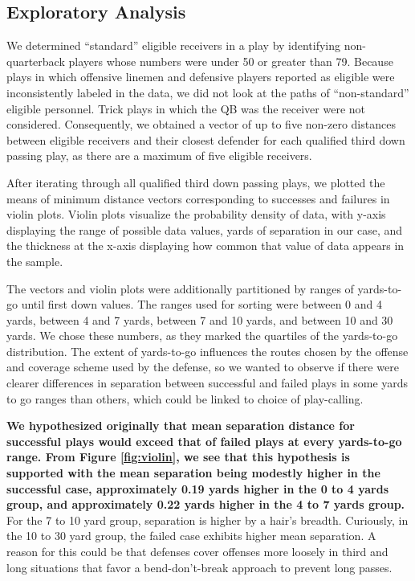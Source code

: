 \documentclass[12pt,letterpaper]{article}
\begin{document}
\newpage
\subsection*{Exploratory Analysis}
 
We determined ``standard'' eligible receivers in a play by identifying non-quarterback players whose numbers were under 50 or greater than 79. Because plays in which offensive linemen and defensive players reported as eligible were inconsistently labeled in the data, we did not look at the paths of ``non-standard'' eligible personnel. Trick plays in which the QB was the receiver were not considered. Consequently, we obtained a vector of up to five non-zero distances between eligible receivers and their closest defender for each qualified third down passing play, as there are a maximum of five eligible receivers. 

After iterating through all qualified third down passing plays, we plotted the means of minimum distance vectors corresponding to successes and failures in violin plots. Violin plots visualize the probability density of data, with y-axis displaying the range of possible data values, yards of separation in our case, and the thickness at the x-axis displaying how common that value of data appears in the sample.

The vectors and violin plots were additionally partitioned by ranges of yards-to-go until first down values. The ranges used for sorting were between 0 and 4 yards, between 4 and 7 yards, between 7 and 10 yards, and between 10 and 30 yards. We chose these numbers, as they marked the quartiles of the yards-to-go distribution. The extent of yards-to-go influences the routes chosen by the offense and coverage scheme used by the defense, so we wanted to observe if there were clearer differences in separation between successful and failed plays in some yards to go ranges than others, which could be linked to choice of play-calling.

\textbf{We hypothesized originally that mean separation distance for successful plays would exceed that of failed plays at every yards-to-go range. From Figure \ref{fig:violin}, we see that this hypothesis is supported with the mean separation being modestly higher in the successful case, approximately 0.19 yards higher in the 0 to 4 yards group, and approximately 0.22 yards higher in the 4 to 7 yards group.} For the 7 to 10 yard group, separation is higher by a hair's breadth. Curiously, in the 10 to 30 yard group, the failed case exhibits higher mean separation. A reason for this could be that defenses cover offenses more loosely in third and long situations that favor a bend-don't-break approach to prevent long passes. 
\end{document}
